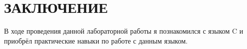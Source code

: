 \section*{ЗАКЛЮЧЕНИЕ}

В ходе проведения данной лабораторной работы я познакомился с языком C и приобрёл практические навыки по работе с данным языком.

\newpage